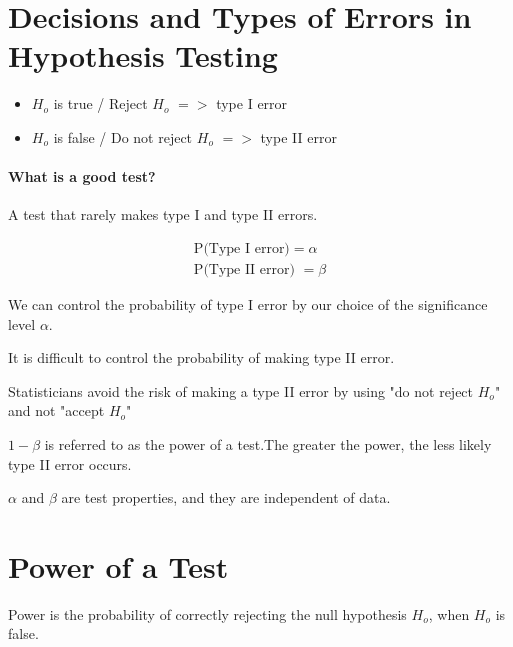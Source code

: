 \documentclass{article}
\begin{document}
        \section*{Decisions and Types of Errors in Hypothesis Testing}
        \begin{itemize}
            \item $H_{o}$ is true / Reject $H_{o}$ $=>$ type I error
            \item $H_{o}$ is false / Do not reject $H_{o}$ $=>$ type II error
        \end{itemize}

        \paragraph*{What is a good test?\newline}
        A test that rarely makes type I and type II errors.

        \begin{align*}
            \text{P(Type I error)} = \alpha \\
            \text{P(Type II error) }= \beta
        \end{align*}

        We can control the probability of type I error by our choice of the significance level $\alpha$.\par

        It is difficult to control the probability of making type II error.\par

        Statisticians avoid the risk of making a type II error by using "do not reject $H_{o}$" 
        and not "accept $H_{o}$"\par

        $1-\beta$  is referred to as the power of a test.The greater the power, 
        the less likely type II error occurs.\par

        $\alpha$ and $\beta$ are test properties, and they are independent of data.

        \section*{Power of a Test}
        Power is the probability of correctly rejecting the null hypothesis 
        $H_{o}$, when $H_{o}$ is false. 
\end{document}
